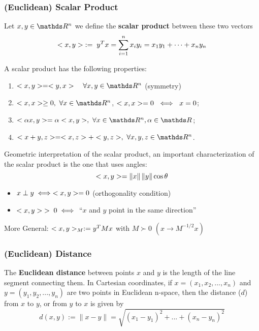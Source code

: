 \documentclass[computational_mathematics.tex]{subfiles}
\begin{document}


\subsubsection{(Euclidean) Scalar Product}

\begin{definition}
  Let $x, y \in \R^n$ we define the \textbf{scalar product} between these two vectors 
  \[
<x, y> \; := \; y^T x = \sum_{i=1}^n x_i y_i = x_1 y_1 + \cdots + x_n y_n
  \]
\end{definition}

\begin{proposition}
A scalar product has the following properties:
\begin{enumerate}
  \item $\ps{x}{y} = \ps{y}{x} \quad \forall x, y \in \R^n$ (symmetry)
  \item $\ps{x}{x} \ge 0,~\forall x \in \R^n$, $<x, x>=0~\iff~x=0$;
  \item $\ps{\alpha x}{y} = \alpha \ps{x}{y},~\forall x\in\R^n, \alpha \in \R$;
  \item $\ps{x + y}{z} = \ps{x}{z} + \ps{y}{z},~\forall x,y, z \in \R^n$.
\end{enumerate}
\end{proposition}

Geometric interpretation of the scalar product, an important characterization of the scalar product is the one that uses angles:
$$<x, y> = \left\lVert x\right\rVert \left\lVert y\right\rVert \cos \theta$$ 
\begin{itemize}
    \item $x \perp y \iff <x, y> = 0$ (orthogonality condition)
    \item $<x, y> \; >\;  0 \iff$ ``$x$ and $y$ point in the same direction''
\end{itemize}

\noindent More General: $ <x, y>_M := y^TMx $ with $M \succ 0$  $( x \longrightarrow M^{-1/2}x)$

\subsubsection{(Euclidean) Distance}
\begin{definition}
The \textbf{Euclidean distance} between points $x$ and $y$ is the length of the line segment connecting them. In Cartesian coordinates, if $x = (x_{1}, x_{2},..., x_{n})$ and $y = (y_{1}, y_{2},..., y_{n})$ are two points in Euclidean n-space, then the distance ($d$) from $x$ to $y$, or from $y$ to $x$ is given by
  \[
    d(x,y) := \lVert x - y \rVert = \sqrt{(x_{1} - y_{1})^{2} + ... + (x_{n} - y_{n})^{2}} 
  \]
  
\end{definition}
 
\end{document}
